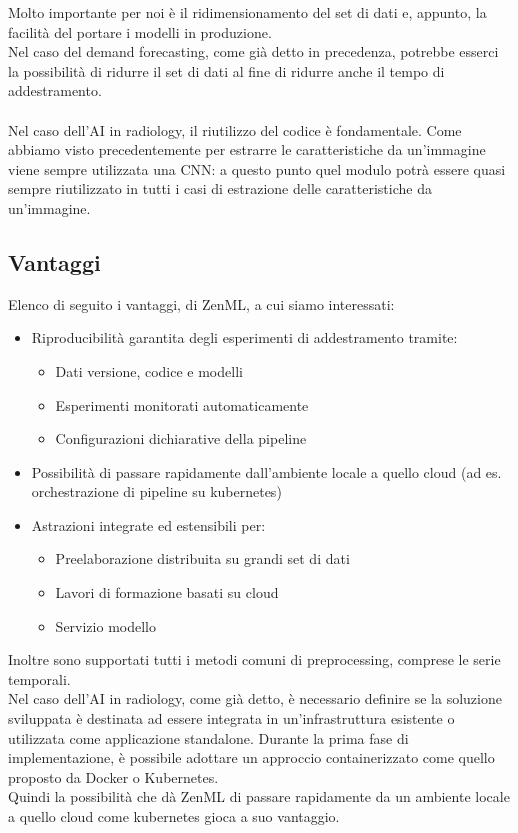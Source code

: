 \documentclass[12pt,a4paper]{report}
\begin{document}
Molto importante per noi è il ridimensionamento del set di dati e, appunto, la facilità del portare i modelli in produzione.\\
Nel caso del demand forecasting, come già detto in precedenza, potrebbe esserci la possibilità di ridurre il set di dati al fine di ridurre anche il tempo di addestramento.\\
\\
Nel caso dell'AI in radiology, il riutilizzo del codice è fondamentale. Come abbiamo visto precedentemente per estrarre le caratteristiche da un'immagine viene sempre utilizzata una CNN: a questo punto quel modulo potrà essere quasi sempre riutilizzato in tutti i casi di estrazione delle caratteristiche da un'immagine.\\

\subsection{Vantaggi}
Elenco di seguito i vantaggi, di ZenML, a cui siamo interessati:
\begin{itemize}
    \item Riproducibilità garantita degli esperimenti di addestramento tramite:
    \begin{itemize}
        \item Dati versione, codice e modelli
        \item Esperimenti monitorati automaticamente
        \item Configurazioni dichiarative della pipeline
    \end{itemize}
    \item Possibilità di passare rapidamente dall'ambiente locale a quello cloud (ad es. orchestrazione di pipeline su kubernetes)
    \item Astrazioni integrate ed estensibili per:
    \begin{itemize}
        \item Preelaborazione distribuita su grandi set di dati
        \item Lavori di formazione basati su cloud        
        \item Servizio modello
    \end{itemize}
\end{itemize}
Inoltre sono supportati tutti i metodi comuni di preprocessing, comprese le serie temporali.\\
Nel caso dell'AI in radiology, come già detto, è necessario definire se la soluzione sviluppata è destinata ad essere integrata in un'infrastruttura esistente o utilizzata come applicazione standalone. Durante la prima fase di implementazione, è possibile adottare un approccio containerizzato come quello proposto da Docker o Kubernetes.\\
Quindi la possibilità che dà ZenML di passare rapidamente da un ambiente locale a quello cloud come kubernetes gioca a suo vantaggio.
\end{document}
